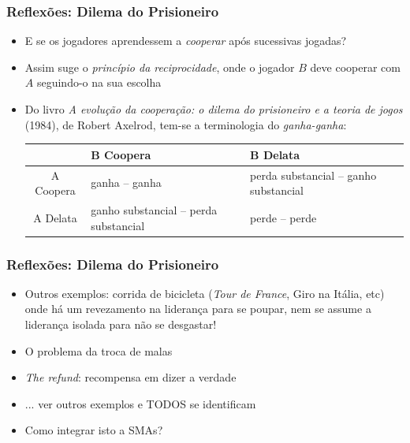 \begin{frame}
\frametitle{Reflexões: Dilema do Prisioneiro}

\begin{itemize}
  \item E se os jogadores aprendessem a \textit{cooperar} após sucessivas jogadas?

  \item Assim suge o \textit{princípio da reciprocidade}, onde o jogador $B$   deve cooperar com $A$ seguindo-o na sua escolha

\pause 
  \item Do livro \textit{A evolução da cooperação: o dilema do prisioneiro e a teoria de jogos} (1984),  de Robert Axelrod, tem-se a terminologia do \textit{ganha-ganha}: 
    
  \begin{center}
    \begin{tabular}{c||p{3cm}|p{3cm}}
    \hline \hline
                & B Coopera & B Delata  \\     \hline \hline
     A Coopera  &   ganha -- ganha     & perda substancial -- ganho substancial  \\     \hline 
     A Delata   &    	ganho substancial -- perda substancial &  	perde -- perde   \\
         \hline \hline

    \end{tabular}
  \end{center}

\end{itemize}

\end{frame}

\begin{frame}
\frametitle{Reflexões: Dilema do Prisioneiro}

\begin{itemize}
\item Outros exemplos: corrida de bicicleta (\textit{Tour de France}, Giro na Itália, etc)  onde há um revezamento na liderança para se poupar, nem se assume a liderança isolada para não se desgastar!

\item O problema da troca de malas

\item \textit{The refund}: recompensa em dizer a verdade 

\item ... ver outros exemplos e TODOS se identificam

\item Como integrar isto a SMAs?
\end{itemize}

\end{frame}

